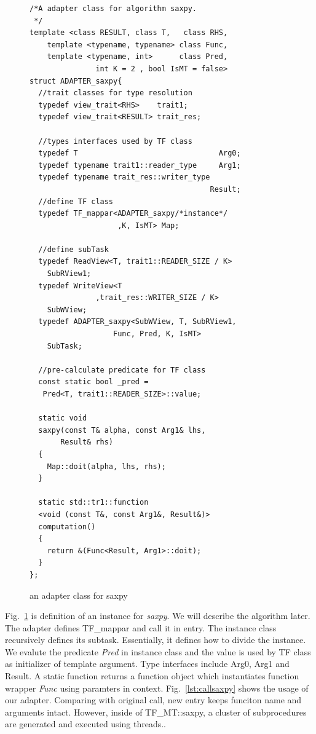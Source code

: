 \documentclass[10pt, conference, compsocconf]{IEEEtran}
\begin{document}
\begin{figure}[!htp]
\begin{minipage}[tb]{\linewidth}
\makebox[\textwidth]{\hrulefill}
\begin{small}
\begin{verbatim}
/*A adapter class for algorithm saxpy.
 */
template <class RESULT, class T,   class RHS, 
    template <typename, typename> class Func,
    template <typename, int>      class Pred,
               int K = 2 , bool IsMT = false>
struct ADAPTER_saxpy{
  //trait classes for type resolution
  typedef view_trait<RHS>    trait1;
  typedef view_trait<RESULT> trait_res;
  
  //types interfaces used by TF class
  typedef T                                Arg0;
  typedef typename trait1::reader_type     Arg1;
  typedef typename trait_res::writer_type 
                                         Result;
  //define TF class
  typedef TF_mappar<ADAPTER_saxpy/*instance*/
                    ,K, IsMT> Map;

  //define subTask
  typedef ReadView<T, trait1::READER_SIZE / K>
    SubRView1;
  typedef WriteView<T 
               ,trait_res::WRITER_SIZE / K>
    SubWView;
  typedef ADAPTER_saxpy<SubWView, T, SubRView1, 
                   Func, Pred, K, IsMT>
    SubTask;

  //pre-calculate predicate for TF class
  const static bool _pred = 
   Pred<T, trait1::READER_SIZE>::value;

  static void 
  saxpy(const T& alpha, const Arg1& lhs, 
       Result& rhs)
  {
    Map::doit(alpha, lhs, rhs);
  }
  
  static std::tr1::function
  <void (const T&, const Arg1&, Result&)>
  computation() 
  {
    return &(Func<Result, Arg1>::doit);
  }
};
\end{verbatim}
\end{small}
\vspace{-1ex}\makebox[\textwidth]{\hrulefill}
\end{minipage}
\caption{an adapter class for saxpy}\label{lst:adaptersaxpy}
\end{figure}
Fig.~\ref{lst:adaptersaxpy} is definition of an instance for
\emph{saxpy}. We will describe the algorithm later. The adapter defines TF\_mappar and call it in entry. 
The instance class recursively defines its subtask. Essentially, 
it defines how to divide the instance.
We evalute the predicate \emph{Pred} in instance class and the value
is used by TF class as initializer of  template argument.
Type interfaces include Arg0, Arg1 and Result. A static function returns a function object which
instantiates function wrapper \emph{Func} using paramters in context. Fig.~\ref{lst:callsaxpy}
shows the usage of our adapter. Comparing with original call, new
entry keeps funciton name and arguments intact. However, inside of
TF\_MT::saxpy, a cluster of subprocedures are generated and executed
using threads..
\end{document}
